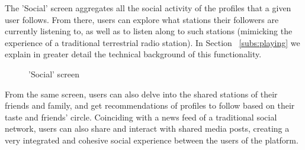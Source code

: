 The 'Social' screen aggregates all the social activity of the profiles that a given user follows. From there, users can explore what stations their followers are currently listening to, as well as to listen along to such stations (mimicking the experience of a traditional terrestrial radio station). In Section ~\ref{subs:playing} we explain in greater detail the technical background of this functionality.

\begin{figure}[htbp]
	\centering
	 \qquad
	 \qquad
	\caption{'Social' screen}
	\label{fig:mfp1}
\end{figure}

From the same screen, users can also delve into the shared stations of their friends and family, and get recommendations of profiles to follow based on their taste and friends' circle. Coinciding with a news feed of a traditional social network, users can also share and interact with shared media posts, creating a very integrated and cohesive social experience between the users of the platform.

